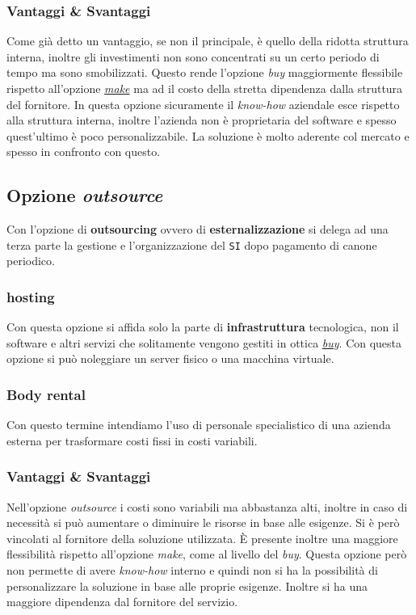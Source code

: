         \subsubsection{Vantaggi \& Svantaggi}
            Come già detto un vantaggio, se non il principale, è quello della ridotta struttura interna, inoltre gli investimenti non sono concentrati su un certo periodo di tempo ma sono smobilizzati. Questo rende l'opzione \textit{buy} maggiormente flessibile rispetto all'opzione \hyperref[sec:opzMake]{\textit{make}} ma ad il costo della stretta dipendenza dalla struttura del fornitore. In questa opzione sicuramente il \textit{know-how} aziendale esce rispetto alla struttura interna, inoltre l'azienda non è proprietaria del software e spesso quest'ultimo è poco personalizzabile. La soluzione è molto aderente col mercato e spesso in confronto con questo.
    \subsection{Opzione \textit{outsource}}
        Con l'opzione di \textbf{outsourcing} ovvero di \textbf{esternalizzazione} si delega ad una terza parte la gestione e l'organizzazione del \texttt{SI} dopo pagamento di canone periodico.
        \subsubsection{hosting}
            Con questa opzione si affida solo la parte di \textbf{infrastruttura} tecnologica, non il software e altri servizi che solitamente vengono gestiti in ottica \hyperref[sec:opzBuy]{\textit{buy}}. Con questa opzione si può noleggiare un server fisico o una macchina virtuale.
        \subsubsection{Body rental}
            Con questo termine intendiamo l'uso di personale specialistico di una azienda esterna per trasformare costi fissi in costi variabili.
        \subsubsection{Vantaggi \& Svantaggi}
            Nell'opzione \textit{outsource} i costi sono variabili ma abbastanza alti, inoltre in caso di necessità si può aumentare o diminuire le risorse in base alle esigenze. Si è però vincolati al fornitore della soluzione utilizzata. È presente inoltre una maggiore flessibilità rispetto all'opzione \textit{make}, come al livello del \textit{buy}. Questa opzione però non permette di avere \textit{know-how} interno e quindi non si ha la possibilità di personalizzare la soluzione in base alle proprie esigenze. Inoltre si ha una maggiore dipendenza dal fornitore del servizio.

